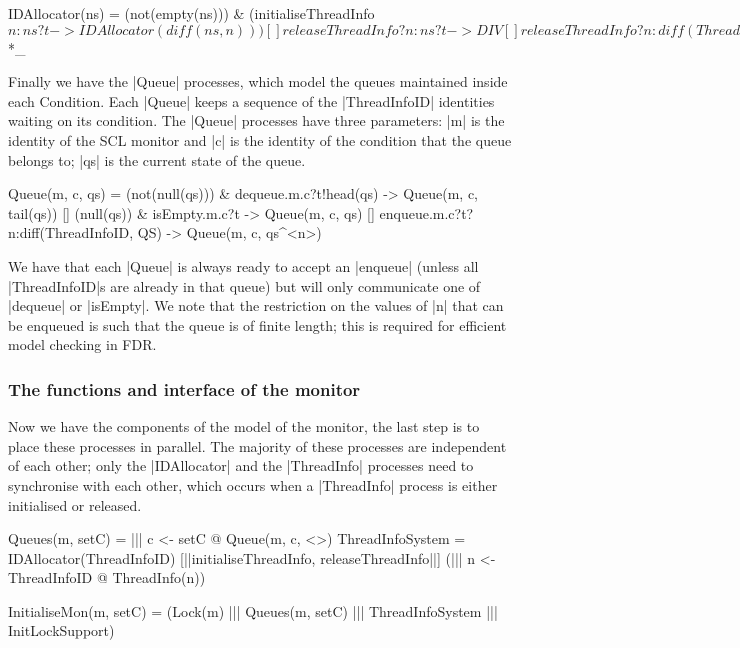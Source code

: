 \begin{cspm}[caption={The {\scalastyle IDAllocator} process}]
  IDAllocator(ns) = 
    (not(empty(ns))) & 
      (initialiseThreadInfo$n:ns?t -> IDAllocator(diff(ns, {n})))
  [] releaseThreadInfo?n:ns?t -> DIV
  [] releaseThreadInfo?n:diff(ThreadInfoID, ns)?t -> IDAllocator(union(ns, {n}))_*$*_
\end{cspm}

Finally we have the |Queue| processes, which model the queues maintained inside each Condition. Each |Queue| keeps a sequence of the |ThreadInfoID| identities waiting on its condition. The |Queue| processes have three parameters: |m| is the identity of the SCL monitor and |c| is the identity of the condition that the queue belongs to; |qs| is the current state of the queue.%

\begin{cspm}
  Queue(m, c, qs) = 
       (not(null(qs))) & dequeue.m.c?t!head(qs) -> Queue(m, c, tail(qs))
    [] (null(qs)) & isEmpty.m.c?t -> Queue(m, c, qs)
    [] enqueue.m.c?t?n:diff(ThreadInfoID, QS) -> Queue(m, c, qs^<n>) 
\end{cspm}

We have that each |Queue| is always ready to accept an |enqueue| (unless all |ThreadInfoID|s are already in that queue) but will only communicate one of |dequeue| or |isEmpty|. We note that the restriction on the values of |n| that can be enqueued is such that the queue is of finite length; this is required for efficient model checking in FDR.

\subsubsection{The functions and interface of the monitor}

Now we have the components of the model of the monitor, the last step is to place these processes in parallel. The majority of these processes are independent of each other; only the |IDAllocator| and the |ThreadInfo| processes need to synchronise with each other, which occurs when a |ThreadInfo| process is either initialised or released.
\begin{cspm}
Queues(m, setC) = ||| c <- setC @ Queue(m, c, <>)
ThreadInfoSystem = 
  IDAllocator(ThreadInfoID) 
    [|{|initialiseThreadInfo, releaseThreadInfo|}|] (||| n <- ThreadInfoID @ ThreadInfo(n))
    
InitialiseMon(m, setC) = 
  (Lock(m) ||| Queues(m, setC) ||| ThreadInfoSystem ||| InitLockSupport)
\end{cspm} 

